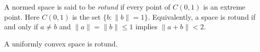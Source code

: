 \documentclass[12pt]{article}
\begin{document}
A normed space is said to be {\it rotund} if every point of $C(0,1)$ is an extreme point. Here $C(0,1)$ is the set $\{b: \lVert b \rVert = 1\}$.
Equivalently, a space is rotund if and only if
$a \neq b$ and $\lVert a \rVert = \lVert  b \rVert\leq 1$ implies $\lVert a+b \rVert < 2$. 

A uniformly convex space is rotund. 
\end{document}
